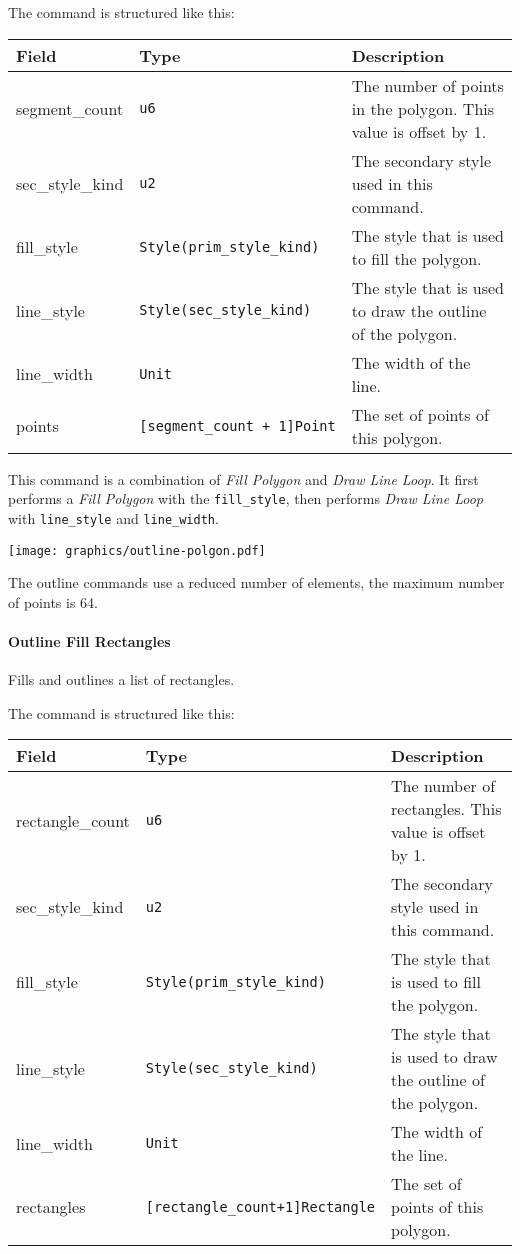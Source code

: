 \documentclass[]{article}
\begin{document}
The command is structured like this:

\begin{longtable}[]{@{}p{1in}p{2in}p{3in}@{}}
\toprule
Field & Type & Description \\
\midrule
\endhead
segment\_count & \texttt{u6} & The number of points in the polygon. This
value is offset by 1. \\
sec\_style\_kind & \texttt{u2} & The secondary style used in this command. \\
fill\_style & \texttt{Style(prim\_style\_kind)} & The style that is used to fill the polygon. \\
line\_style & \texttt{Style(sec\_style\_kind)} & The style that is used to draw the outline of the polygon. \\
line\_width & \texttt{Unit} & The width of the line. \\
points & \texttt{{[}segment\_count\ +\ 1{]}Point} & The set of points of this polygon. \\
\bottomrule
\end{longtable}

This command is a combination of \emph{Fill Polygon} and \emph{Draw Line Loop}. It first performs a \emph{Fill Polygon} with the \texttt{fill\_style}, then performs \emph{Draw Line Loop} with \texttt{line\_style} and \texttt{line\_width}.

\begin{center}
\texttt{[image: graphics/outline-polgon.pdf]}
\end{center}

The outline commands use a reduced number of elements, the maximum
number of points is 64.

\hypertarget{outline-fill-rectangles}{\paragraph{Outline Fill Rectangles}\label{outline-fill-rectangles}}

Fills and outlines a list of rectangles.

The command is structured like this:

\begin{longtable}[]{@{}p{1in}p{2.2in}p{2.8in}@{}}
\toprule
Field & Type & Description \\
\midrule
\endhead
rectangle\_count & \texttt{u6} & The number of rectangles. This value is offset by 1. \\
sec\_style\_kind & \texttt{u2} & The secondary style used in this command. \\
fill\_style & \texttt{Style(prim\_style\_kind)} & The style that is used to fill the polygon. \\
line\_style & \texttt{Style(sec\_style\_kind)} & The style that is used to draw the outline of the polygon. \\
line\_width & \texttt{Unit} & The width of the line. \\
rectangles & \texttt{{[}rectangle\_count+1{]}Rectangle} & The set of points of this polygon. \\
\bottomrule
\end{longtable}
\end{document}
